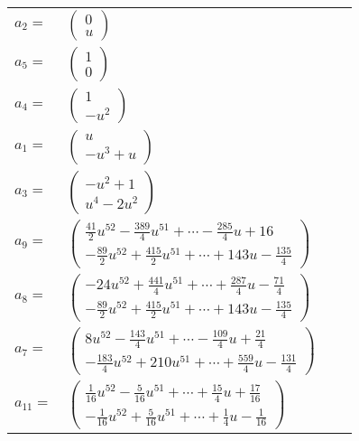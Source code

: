 \documentclass[1p]{elsarticle_modified}
\theoremstyle{definition}
\begin{document}
\begin{tabular}{m{7pt} m{180pt} m{7pt} m{180pt} }
\flushright $a_{2}=$&$\begin{pmatrix}0\\u\end{pmatrix}$ \\
\flushright $a_{5}=$&$\begin{pmatrix}1\\0\end{pmatrix}$ \\
\flushright $a_{4}=$&$\begin{pmatrix}1\\- u^2\end{pmatrix}$ \\
\flushright $a_{1}=$&$\begin{pmatrix}u\\- u^3+u\end{pmatrix}$ \\
\flushright $a_{3}=$&$\begin{pmatrix}- u^2+1\\u^4-2 u^2\end{pmatrix}$ \\
\flushright $a_{9}=$&$\begin{pmatrix}\frac{41}{2} u^{52}-\frac{389}{4} u^{51}+\cdots-\frac{285}{4} u+16\\-\frac{89}{2} u^{52}+\frac{415}{2} u^{51}+\cdots+143 u-\frac{135}{4}\end{pmatrix}$ \\
\flushright $a_{8}=$&$\begin{pmatrix}-24 u^{52}+\frac{441}{4} u^{51}+\cdots+\frac{287}{4} u-\frac{71}{4}\\-\frac{89}{2} u^{52}+\frac{415}{2} u^{51}+\cdots+143 u-\frac{135}{4}\end{pmatrix}$ \\
\flushright $a_{7}=$&$\begin{pmatrix}8 u^{52}-\frac{143}{4} u^{51}+\cdots-\frac{109}{4} u+\frac{21}{4}\\-\frac{183}{4} u^{52}+210 u^{51}+\cdots+\frac{559}{4} u-\frac{131}{4}\end{pmatrix}$ \\
\flushright $a_{11}=$&$\begin{pmatrix}\frac{1}{16} u^{52}-\frac{5}{16} u^{51}+\cdots+\frac{15}{4} u+\frac{17}{16}\\-\frac{1}{16} u^{52}+\frac{5}{16} u^{51}+\cdots+\frac{1}{4} u-\frac{1}{16}\end{pmatrix}$ \\

\end{tabular}
\end{document}
